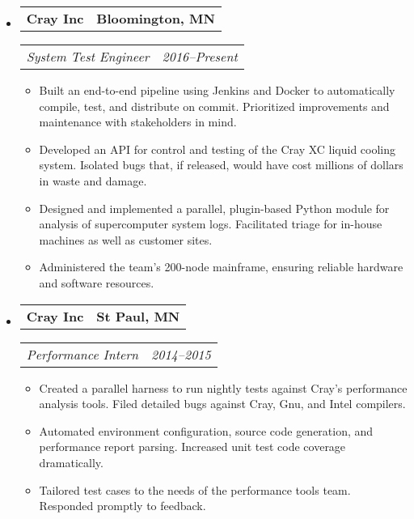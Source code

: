 \documentclass[11pt,letterpaper]{article}
\makeatletter
\newcommand{\headerrow}[2]{
    \begin{tabular*}{\linewidth}{l@{ \extracolsep{\fill} }r} #1 & #2
    \end{tabular*}
}
\newcommand{\YearRange}[2]{#1--#2}
\makeatother
\begin{document}
\begin{itemize}[leftmargin=\parindent]
    \parskip=0.1em
    \itemsep=1.5em

    \item[]
        \headerrow{ \textbf{Cray Inc} }{ \textbf{Bloomington, MN} }
        \headerrow
            { \emph{System Test Engineer} }
            { \emph{ \YearRange{2016}{Present} } }
        \begin{itemize}
            \item Built an end-to-end pipeline using Jenkins and Docker to automatically compile, test, and distribute on commit. Prioritized improvements and maintenance with stakeholders in mind.
            \item Developed an API for control and testing of the Cray XC liquid cooling system. Isolated bugs that, if released, would have cost millions of dollars in waste and damage.
            \item Designed and implemented a parallel, plugin-based Python module for analysis of supercomputer system logs. Facilitated triage for in-house machines as well as customer sites.
            \item Administered the team's 200-node mainframe, ensuring reliable hardware and software resources.
        \end{itemize}

    \item[]
        \headerrow{ \textbf{Cray Inc} }{ \textbf{St Paul, MN} }
        \headerrow
            { \emph{Performance Intern} }
            { \emph{ \YearRange{2014}{2015} } }
        \begin{itemize}
            \item Created a parallel harness to run nightly tests against Cray's performance analysis tools. Filed detailed bugs against Cray, Gnu, and Intel compilers.
            \item Automated environment configuration, source code generation, and performance report parsing. Increased unit test code coverage dramatically.
            \item Tailored test cases to the needs of the performance tools team. Responded promptly to feedback.
        \end{itemize}


\end{itemize}
\end{document}
